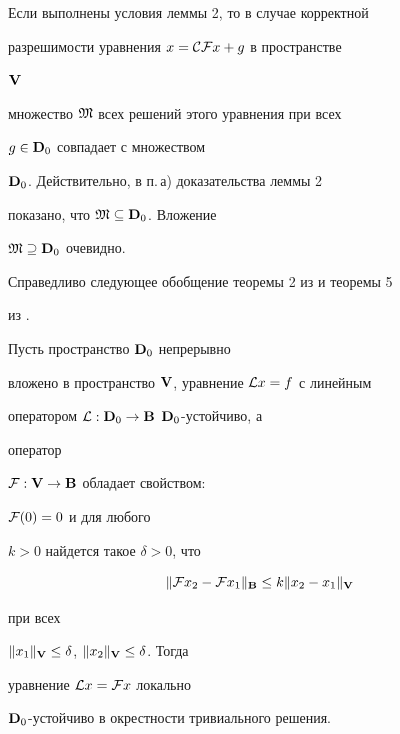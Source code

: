 \begin{note}


Если выполнены условия леммы 2, то в случае корректной


разрешимости уравнения $x={\cal C}{\cal F}x+g$ в пространстве


$\bold {V}$


множество $\frak M$ всех решений этого уравнения при всех


$g\in\bold {D}_0$ совпадает с множеством


$\bold {D}_0$. Действительно, в п.\,а) доказательства леммы 2


показано, что $\frak M\subseteq\bold {D}_0$. Вложение


$\frak M\supseteq\bold {D}_0$ очевидно.


\end{note}





Справедливо следующее обобщение теоремы 2 из \cite{7} и теоремы 5


из \cite{9}.





\begin{thm}


Пусть пространство $\bold {D}_0$ непрерывно


вложено в пространство $\bold {V}$, уравнение ${\cal L}x=f$ с линейным


оператором ${\cal L}:\bold {D}_0\to\bold {B}$\; $\bold {D}_0$-устойчиво, а


оператор


${\cal F}:\bold {V}\to\bold {B}$ обладает свойством$:$


${\cal F}(0)=0$ и для любого


$k>0$ найдется такое $\delta>0$, что


\begin{equation}


\|{\cal F}x_2-{\cal F}x_1\|_{\bold B}\le


k\|x_2-x_1\|_{\bold V}


\end{equation}


при всех


$\|x_1\|_{\bold V}\le\delta$, $\|x_2\|_{\bold V}\le\delta$. Тогда


уравнение ${\cal L}x={\cal F}x$ локально


$\bold {D}_0$-устойчиво в окрестности тривиального решения.


\end{thm}





